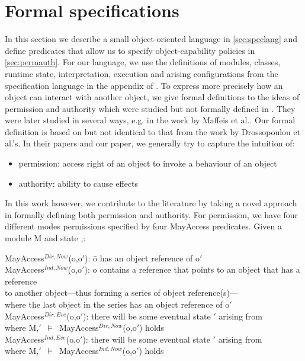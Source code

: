 \documentclass[a4paper,11pt,twoside]{article}
\newcommand{\losigma}{\text{$\upsigma$}}
\newcommand{\loturns} {$\vDash$}
\begin{document}
\section{Formal specifications}\label{sec:specs}
In this section we describe a small object-oriented language in \cref{sec:speclang} and define predicates that allow us to specify object-capability policies in \cref{sec:permauth}. For our language, we use the definitions of modules, classes, runtime state, interpretation, execution and arising configurations from the specification language in the appendix of \cite{drossopoulou2015b}. To express more precisely how an object can interact with another object, we give formal definitions to the ideas of permission and authority which were studied but not formally defined in \cite{miller2006}. They were later studied in several ways, e.g. in the work by Maffeis et al.\cite{maffeis2010}. Our formal definition is based on but not identical to that from  the work by Drossopoulou et al.'s\cite{drossopoulou2016}. In their papers and our paper, we generally try to capture the intuition of:
\begin{itemize}
\item permission: access right of an object to invoke a behaviour of an object
\item authority: ability to cause effects
\end{itemize}
In this work however, we contribute to the literature by taking a novel approach in formally defining both permission and authority. For permission, we have four different modes permissions specified by four MayAccess predicates. Given a module M and state \losigma,:
\begin{tabbing}
MayAccess$^{Dir,Now}$(o,o$'$): \=o has an object reference of o$'$\\
MayAccess$^{Ind,Now}$(o,o$'$): o contains a reference that points to an object that has a reference\\
\>to another object---thus forming a series of object reference(s)---\\ \> where the last object in the series has an object reference of o$'$\\
MayAccess$^{Dir,Eve}$(o,o$'$): there will be some eventual state \losigma$'$ arising from \losigma\,\\ \> where M,\losigma$'$\ \loturns\ MayAccess$^{Dir,Now}$(o,o$'$) holds\\
MayAccess$^{Ind,Eve}$(o,o$'$): there will be some eventual state \losigma$'$ arising from \losigma\,\\ \> where M,\losigma$'$\ \loturns\ MayAccess$^{Ind,Now}$(o,o$'$) holds\\
\end{tabbing}
\end{document}
